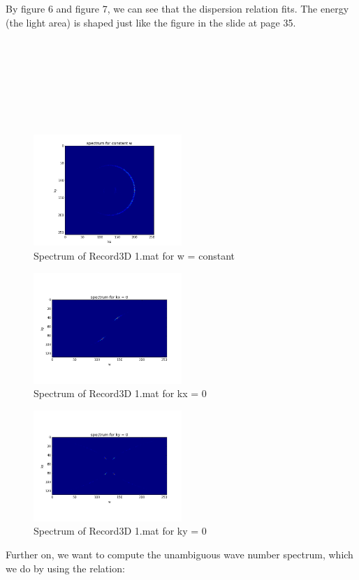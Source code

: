 \documentclass[12pt]{article}
\begin{document}
By figure 6 and figure 7, we can see that the dispersion relation fits. The energy (the light area) is shaped just like the figure in the slide at page 35.\\\\ 
\\\\\\\\\\\
\begin{figure}
  \caption{Spectrum of Record3D 1.mat for w = constant}
  \centering
    \includegraphics[width=0.5\textwidth]{spectrumW0.png}
\end{figure}

\begin{figure}
  \caption{Spectrum of Record3D 1.mat for kx = 0}
  \centering
    \includegraphics[width=0.5\textwidth]{spectrumkx=0.png}
\end{figure}

\begin{figure}
  \caption{Spectrum of Record3D 1.mat for ky = 0}
  \centering
    \includegraphics[width=0.5\textwidth]{spectrumky=0.png}
\end{figure}
Further on, we want to compute the unambiguous wave number spectrum, which we do by using the relation:
\end{document}
